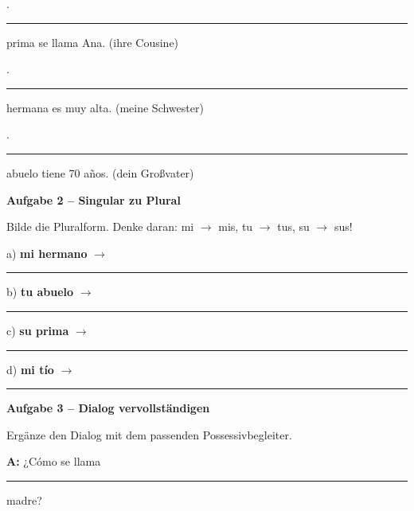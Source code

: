 \documentclass[11pt, a4paper]{article}
\newcommand{\fachfarbe}{spanisch}
\newcommand{\punktebox}[1]{\hfill\fbox{\small \_/#1}}
\newcommand{\luecke}[1]{\rule{#1}{0.4pt}}
\newenvironment{aufgabe}[1]{%
    \needspace{5\baselineskip}%
    \nopagebreak[4]%
    \vspace{10pt}
    \noindent\textbf{\textcolor{\fachfarbe}{Aufgabe #1}}
    \nopagebreak[4]%
    \vspace{5pt}
    \nopagebreak[4]%
    \begin{list}{}{\leftmargin=0pt}
    \item[]
}{%
    \end{list}
}
\newcommand{\es}[1]{\textcolor{\fachfarbe}{\textbf{#1}}}
\begin{document}
\vspace{0.8em}

. \luecke{1.5cm} prima se llama Ana. \hfill (ihre Cousine)

\vspace{0.8em}

. \luecke{1.5cm} hermana es muy alta. \hfill (meine Schwester)

\vspace{0.8em}

. \luecke{1.5cm} abuelo tiene 70 años. \hfill (dein Großvater)

\vspace{15pt}


\begin{aufgabe}{2 -- Singular zu Plural}
Bilde die Pluralform. Denke daran: mi $\rightarrow$ mis, tu $\rightarrow$ tus, su $\rightarrow$ sus! \punktebox{8}
\end{aufgabe}

\noindent
a) \es{mi hermano} $\rightarrow$ \luecke{4cm}

\vspace{0.8em}

\noindent
b) \es{tu abuelo} $\rightarrow$ \luecke{4cm}

\vspace{0.8em}

\noindent
c) \es{su prima} $\rightarrow$ \luecke{4cm}

\vspace{0.8em}

\noindent
d) \es{mi tío} $\rightarrow$ \luecke{4cm}

\vspace{15pt}


\begin{aufgabe}{3 -- Dialog vervollständigen}
Ergänze den Dialog mit dem passenden Possessivbegleiter. \punktebox{10}
\end{aufgabe}

\noindent
\textbf{A:} ¿Cómo se llama \luecke{2cm} madre?

\vspace{0.8em}
\end{document}
